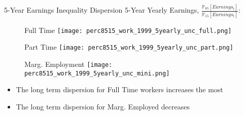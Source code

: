 \documentclass[hyperref={bookmarks=false}]{beamer}
\begin{document}
\begin{appendix}
\begin{frame}{5-Year Earnings Inequality}
Dispersion 5-Year Yearly Earnings, $\frac{\mathbb{P}_{85}[Earnings_t]}{\mathbb{P}_{15}[Earnings_t]}$:
\begin{figure}[!t]
\begin{minipage}[b]{0.32\textwidth}{Full Time}
\centering
\texttt{[image: perc8515\_work\_1999\_5yearly\_unc\_full.png]}
\end{minipage}
\begin{minipage}[b]{0.32\textwidth}{Part Time}
\centering
\texttt{[image: perc8515\_work\_1999\_5yearly\_unc\_part.png]}
\end{minipage}
\begin{minipage}[b]{0.32\textwidth}{Marg. Employment}
\centering
\texttt{[image: perc8515\_work\_1999\_5yearly\_unc\_mini.png]}
\end{minipage}
\end{figure}
\begin{itemize}
\item The long term dispersion for Full Time workers increases the most
\item The long term dispersion for Marg. Employed decreases
\end{itemize}
\end{frame}




\end{appendix}
\end{document}

